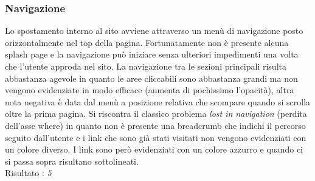 \subsubsection{Navigazione}
Lo spostamento interno al sito avviene attraverso un menù di navigazione posto
orizzontalmente nel top della pagina. Fortunatamente non è presente alcuna
splash page e la navigazione può iniziare senza ulteriori impedimenti 
una volta che l'utente approda nel sito. 
La navigazione tra le sezioni principali
risulta abbastanza agevole in quanto le aree cliccabili sono abbastanza grandi
ma non vengono evidenziate in modo efficace (aumenta di pochissimo l'opacità),
altra nota negativa è data dal 
menù a posizione relativa che scompare quando si scrolla oltre la prima pagina.
Si riscontra il classico problema \textit{lost in navigation} (perdita dell'asse
where) in quanto non è
presente una breadcrumb che indichi il percorso seguito dall'utente e i link che 
sono già stati visitati non vengono evidenziati con un colore diverso. I link 
sono però evidenziati con un colore azzurro e quando ci si passa sopra risultano
sottolineati. \\
Risultato : \textit{5}